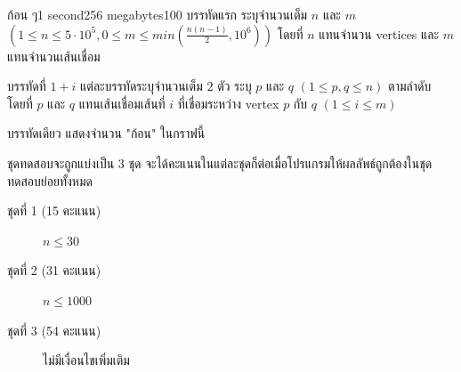 \documentclass[11pt,a4paper]{article}
\begin{document}
\begin{problem}{ก้อน ๆ}{}{}{1 second}{256 megabytes}{100}
บรรทัดแรก ระบุจำนวนเต็ม $n$ และ $m$ $(1 \leq n \leq 5\cdot 10^5 , 0 \leq m \leq min(\frac{n(n-1)}{2}, 10^6))$ โดยที่ $n$ แทนจำนวน vertices และ $m$ แทนจำนวนเส้นเชื่อม 

บรรทัดที่ $1+i$ แต่ละบรรทัดระบุจำนวนเต็ม $2$ ตัว ระบุ $p$ และ $q$ $(1 \leq p,q \leq n)$ ตามลำดับโดยที่ $p$ และ $q$ แทนเส้นเชื่อมเส้นที่ $i$ ที่เชื่อมระหว่าง vertex $p$ กับ $q$ $(1 \leq i \leq m)$

\OutputFile

บรรทัดเดียว แสดงจำนวน "ก้อน" ในกราฟนี้

\Scoring
ชุดทดสอบจะถูกแบ่งเป็น 3 ชุด จะได้คะแนนในแต่ละชุดก็ต่อเมื่อโปรแกรมให้ผลลัพธ์ถูกต้องในชุดทดสอบย่อยทั้งหมด
 
\begin{description}
\item[ชุดที่ 1 (15 คะแนน)] $n \leq 30$
\item[ชุดที่ 2 (31 คะแนน)] $n \leq 1000$
\item[ชุดที่ 3 (54 คะแนน)] ไม่มีเงื่อนไขเพิ่มเติม
\end{description}

\Examples

\begin{example}
%
\end{example}
 
\end{problem}
 
\end{document}
